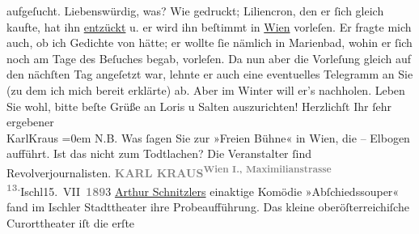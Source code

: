 \begin{ledgroupsized}[t]{13cm}
               aufgeſucht. Liebenswürdig, was? Wie gedruckt; Liliencron, den er ſich gleich kaufte, hat ihn \uline{entzückt} u. er wird ihn beſtimmt in \uline{Wien} vorleſen. Er fragte mich auch, ob ich Gedichte von  hätte; er wollte ſie nämlich in Marienbad, wohin er ſich noch am Tage des Beſuches begab, vorleſen. Da nun
               aber die Vorleſung gleich auf den nächſten Tag angeſetzt war, lehnte er auch eine
               eventuelles Telegramm an Sie (zu dem ich mich bereit erklärte) ab. Aber im
                  Winter will er’s nachholen.\pend
           \pstart
           Leben Sie wohl, bitte beſte Grüße an Loris u
                  Salten auszurichten!\pend
           \pstart
           Herzlichſt Ihr ſehr ergebener{\\[\baselineskip]}\spacefill\mbox{KarlKraus}\pend
           \leftskip=0em{}\pstart
           \noindent{}N.B. Was ſagen Sie zur »Freien Bühne« in Wien, die – Elbogen aufführt. Ist das nicht zum Todtlachen? Die Veranstalter ſind
                  Revolverjournalisten.\pend
           \pstart
           \noindent{}{\pb}\textcolor{gray}{\textbf{KARL KRAUS}}\hfill \substVorne{}\textsuperscript{\textcolor{gray}{\textbf{Wien I., Maximilianstrasse 13.}}}{\allowbreak}\substDazwischen{}Ischl\substHinten{}{ }15. VII \textcolor{gray}{\textbf{189}}3\pend
           \pstart
           \uline{Arthur Schnitzlers} einaktige Komödie »Abſchiedssouper« fand im Ischler Stadttheater ihre Probeaufführung. Das kleine oberöſterreichiſche Curorttheater iſt die erſte

\end{ledgroupsized}
